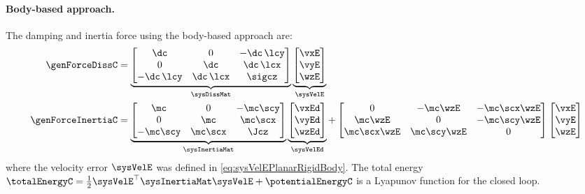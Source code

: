 \paragraph{Body-based approach.}
The damping and inertia force using the body-based approach are:
\begin{subequations}
\begin{align}
 \genForceDissC &= \underbrace{\begin{bmatrix} \dc & 0 &-\dc\,\lcy \\ 0 & \dc & \dc\,\lcx \\ -\dc\,\lcy & \dc\,\lcx & \sigcz \end{bmatrix}}_{\sysDissMat}
 \underbrace{\begin{bmatrix} \vxE \\ \vyE \\ \wzE \end{bmatrix}}_{\sysVelE}
\\
 \genForceInertiaC &= \underbrace{\begin{bmatrix} \mc & 0 & -\mc\scy \\ 0 & \mc & \mc\scx \\ -\mc\scy & \mc\scx & \Jcz \end{bmatrix}}_{\sysInertiaMat}
 \underbrace{\begin{bmatrix} \vxEd \\ \vyEd \\ \wzEd \end{bmatrix}}_{\sysVelEd}
 + \begin{bmatrix} 0 & -\mc\wzE & -\mc\scx\wzE \\ \mc\wzE & 0 & -\mc\scy\wzE \\ \mc\scx\wzE & \mc\scy\wzE & 0 \end{bmatrix}
 \begin{bmatrix} \vxE \\ \vyE \\ \wzE \end{bmatrix}
\end{align} 
\end{subequations}
where the velocity error $\sysVelE$ was defined in \eqref{eq:sysVelEPlanarRigidBody}.
The total energy $\totalEnergyC = \tfrac{1}{2} \sysVelE^\top \sysInertiaMat \sysVelE + \potentialEnergyC$ is a Lyapunov function for the closed loop.

